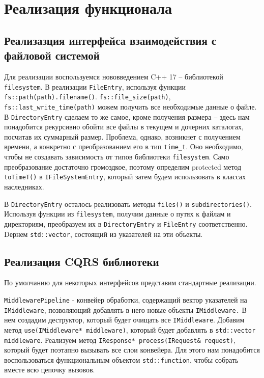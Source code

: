 \chapter{Реализация функционала} \label{ch2}

\section{Реализазция интерфейса взаимодействия с файловой системой} \label{ch2:sec1}

Для реализации воспользуемся нововведением C++ 17 – библиотекой \verb|filesystem|. В реализации \verb|FileEntry|, используя функции \verb|fs::path(path).filename()|. \verb|fs::file_size(path)|, \verb|fs::last_write_time(path)| можем получить все необходимые данные о файле. В \verb|DirectoryEntry| сделаем то же самое, кроме получения размера – здесь нам понадобится рекурсивно обойти все файлы в текущем и дочерних каталогах, посчитав их суммарный размер. Проблема, однако, возникнет с получением времени, а конкретно с преобразованием его в тип \verb|time_t|. Оно необходимо, чтобы не создавать зависимость от типов библиотеки \verb|filesystem|. Само преобразование достаточно громоздкое, поэтому определим protected метод \verb|toTimeT()| в \verb|IFileSystemEntry|, который затем будем использовать в классах наследниках.

В \verb|DirectoryEntry| осталось реализовать методы \verb|files()| и \verb|subdirectories()|. Используя функции из \verb|filesystem|, получим данные о путях к файлам и директориям, преобразуем их в \verb|DirectoryEntry| и \verb|FileEntry| соответственно. Dернем \verb|std::vector|, состоящий из указателей на эти объекты.


\section{Реализация CQRS библиотеки} \label{ch2:sec2}

По умолчанию для некоторых интерфейсов представим стандартные реализации. 

\verb|MiddlewarePipeline| - конвейер обработки, содержащий вектор указателей на \verb|IMiddleware|, позволяющий добавлять в него новые объекты \verb|IMiddleware.| В нем создадим деструктор, который будет очищать все \verb|IMiddleware|. Добавим метод \verb|use(IMiddleware* middleware)|, который будет добавлять в \verb|std::vector| \verb|middleware|. Реализуем метод \verb|IResponse* process(IRequest& request)|, который будет поэтапно вызывать все слои конвейера. Для этого нам понадобится воспользоваться функциональным объектом \verb|std::function|, чтобы собрать вместе всю цепочку вызовов.


